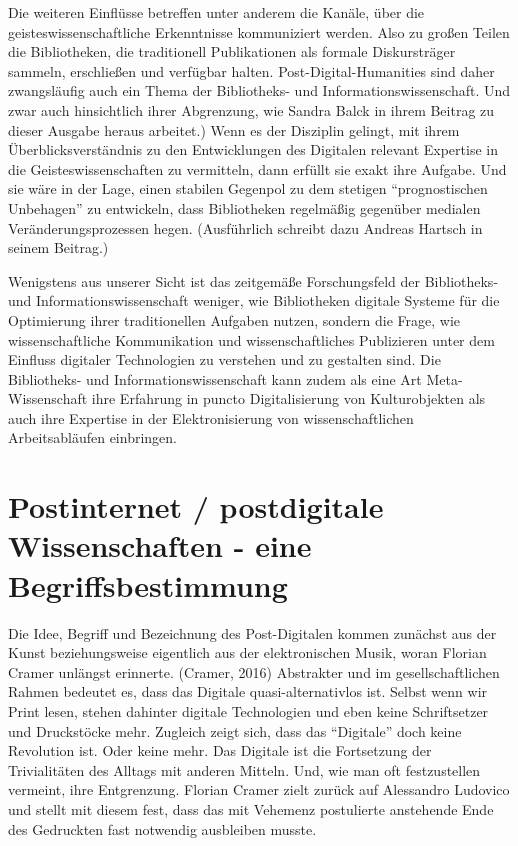 \documentclass[a4paper,
fontsize=11pt,
oneside,
numbers=noperiodatend,
parskip=half-,
bibliography=totoc,
final
]{scrartcl}
\begin{document}
Die weiteren Einflüsse betreffen unter anderem die Kanäle, über die
geisteswissenschaftliche Erkenntnisse kommuniziert werden. Also zu
großen Teilen die Bibliotheken, die traditionell Publikationen als
formale Diskursträger sammeln, erschließen und verfügbar halten.
Post-Digital-Humanities sind daher zwangsläufig auch ein Thema der
Bibliotheks- und Informationswissenschaft. Und zwar auch hinsichtlich
ihrer Abgrenzung, wie Sandra Balck in ihrem Beitrag zu dieser Ausgabe
heraus arbeitet.) Wenn es der Disziplin gelingt, mit ihrem
Überblicksverständnis zu den Entwicklungen des Digitalen relevant
Expertise in die Geisteswissenschaften zu vermitteln, dann erfüllt sie
exakt ihre Aufgabe. Und sie wäre in der Lage, einen stabilen Gegenpol zu
dem stetigen \enquote{prognostischen Unbehagen} zu entwickeln, dass
Bibliotheken regelmäßig gegenüber medialen Veränderungsprozessen hegen.
(Ausführlich schreibt dazu Andreas Hartsch in seinem Beitrag.)

Wenigstens aus unserer Sicht ist das zeitgemäße Forschungsfeld der
Bibliotheks- und Informationswissenschaft weniger, wie Bibliotheken
digitale Systeme für die Optimierung ihrer traditionellen Aufgaben
nutzen, sondern die Frage, wie wissenschaftliche Kommunikation und
wissenschaftliches Publizieren unter dem Einfluss digitaler Technologien
zu verstehen und zu gestalten sind. Die Bibliotheks- und
Informationswissenschaft kann zudem als eine Art Meta-Wissenschaft ihre
Erfahrung in puncto Digitalisierung von Kulturobjekten als auch ihre
Expertise in der Elektronisierung von wissenschaftlichen Arbeitsabläufen
einbringen.

\section*{Postinternet / postdigitale Wissenschaften - eine
Begriffsbestimmung}\label{postinternet-postdigitale-wissenschaften---eine-begriffsbestimmung}

Die Idee, Begriff und Bezeichnung des Post-Digitalen kommen zunächst aus
der Kunst beziehungsweise eigentlich aus der elektronischen Musik, woran
Florian Cramer unlängst erinnerte. (Cramer, 2016) Abstrakter und im
gesellschaftlichen Rahmen bedeutet es, dass das Digitale
quasi-alternativlos ist. Selbst wenn wir Print lesen, stehen dahinter
digitale Technologien und eben keine Schriftsetzer und Druckstöcke mehr.
Zugleich zeigt sich, dass das \enquote{Digitale} doch keine Revolution
ist. Oder keine mehr. Das Digitale ist die Fortsetzung der Trivialitäten
des Alltags mit anderen Mitteln. Und, wie man oft festzustellen
vermeint, ihre Entgrenzung. Florian Cramer zielt zurück auf Alessandro
Ludovico und stellt mit diesem fest, dass das mit Vehemenz postulierte
anstehende Ende des Gedruckten fast notwendig ausbleiben musste.
\end{document}
